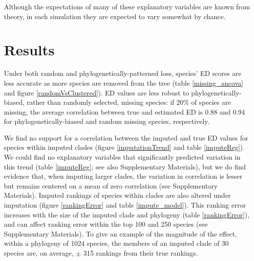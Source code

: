 \documentclass[12pt,english]{article}
\begin{document}
Although the expectations of many of these explanatory variables are
known from theory, in each simulation they are expected to vary
somewhat by chance.

\clearpage
\section*{Results}
Under both random and phylogenetically-patterned loss, species' ED
scores are less accurate as more species are removed from the tree
(table \ref{missing_ancova} and figure \ref{randomVsClustered}). ED
values are less robust to phylogenetically-biased, rather than
randomly selected, missing species: if 20\% of species are missing,
the average correlation between true and estimated ED is 0.88 and 0.94
for phylogenetically-biased and random missing species, respectively.

We find no support for a correlation between the imputed and true ED
values for species within imputed clades (figure \ref{imputationTrend}
and table \ref{imputeReg}). We could find no explanatory variables
that significantly predicted variation in this trend (table
\ref{imputeReg}; see also Supplementary Materials), but we do find
evidence that, when imputing larger clades, the variation in
correlation is lesser but remains centered on a mean of zero
correlation (see Supplementary Materials). Imputed rankings of species
within clades are also altered under imputation (figure
\ref{rankingError} and table \ref{impute_model}). This ranking error
increases with the size of the imputed clade and phylogeny (table
\ref{rankingError}), and can affect ranking error within the top 100
and 250 species (see Supplementary Materials). To give an example of
the magnitude of the effect, within a phylogeny of 1024 species, the
members of an imputed clade of 30 species are, on average, $\pm$ 315
rankings from their true rankings.
\end{document}
